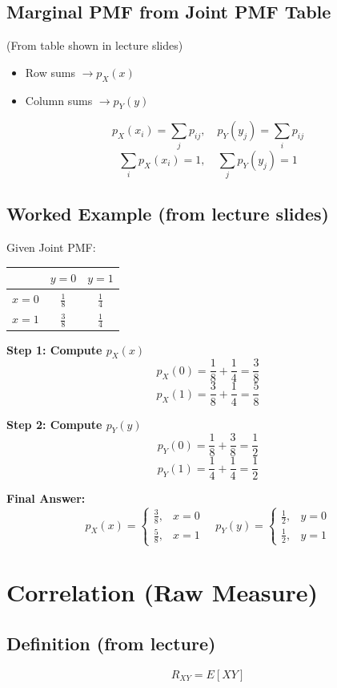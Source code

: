 \documentclass[11pt]{article}
\begin{document}
\subsection{Marginal PMF from Joint PMF Table}
(From table shown in lecture slides)
\begin{itemize}
    \item Row sums $\rightarrow p_X(x)$
    \item Column sums $\rightarrow p_Y(y)$
\end{itemize}
\[ p_X(x_i) = \sum_j p_{ij}, \quad p_Y(y_j) = \sum_i p_{ij} \]
\[ \sum_i p_X(x_i) = 1, \quad \sum_j p_Y(y_j) = 1 \]

\subsection{Worked Example (from lecture slides)}
Given Joint PMF:
\begin{center}
\begin{tabular}{c|cc}
      & $y=0$ & $y=1$ \\
\hline
$x=0$ & $\frac{1}{8}$ & $\frac{1}{4}$ \\[6pt]
$x=1$ & $\frac{3}{8}$ & $\frac{1}{4}$ \\
\end{tabular}
\end{center}

\textbf{Step 1: Compute $p_X(x)$}
\[ p_X(0) = \frac{1}{8} + \frac{1}{4} = \frac{3}{8} \]
\[ p_X(1) = \frac{3}{8} + \frac{1}{4} = \frac{5}{8} \]

\textbf{Step 2: Compute $p_Y(y)$}
\[ p_Y(0) = \frac{1}{8} + \frac{3}{8} = \frac{1}{2} \]
\[ p_Y(1) = \frac{1}{4} + \frac{1}{4} = \frac{1}{2} \]

\textbf{Final Answer:}
\[
p_X(x) =
\begin{cases}
\frac{3}{8}, & x=0 \\
\frac{5}{8}, & x=1
\end{cases}
\quad
p_Y(y) =
\begin{cases}
\frac{1}{2}, & y=0 \\
\frac{1}{2}, & y=1
\end{cases}
\]

\section{Correlation (Raw Measure)}
\subsection{Definition (from lecture)}
\[ R_{XY} = E[XY] \]
\end{document}
